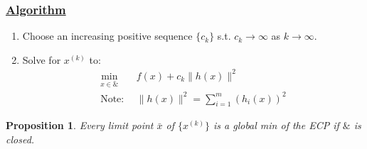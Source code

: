 \documentclass[11pt,a4paper]{article}
\newtheorem{proposition}{Proposition}
\begin{document}
\subsubsection*{\underline{Algorithm}}
\begin{enumerate}[(1)]
    \item Choose an increasing positive sequence $\{c_k\}$ s.t. $c_k \rightarrow \infty$ as $k \rightarrow \infty$.
    \item Solve for $x^{(k)}$ to:
    \begin{equation}
        \begin{aligned}
            \min_{x\in \&}\quad &f(x)+c_k\|h(x)\|^2\\
            \text{Note: } &\|h(x)\|^2=\sum_{i=1}^m(h_i(x))^2
        \end{aligned}
        \nonumber
    \end{equation}
\end{enumerate}
\begin{proposition}
    Every limit point $\bar{x}$ of $\{x^{(k)}\}$ is a global min of the ECP if $\&$ is closed.
\end{proposition}
\end{document}
